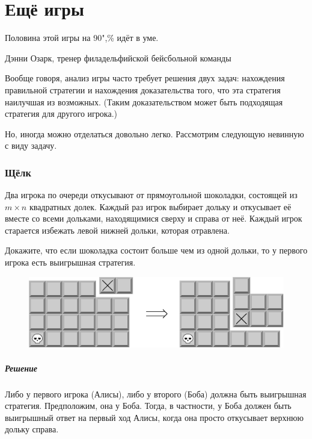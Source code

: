 \documentclass[twoside]{book}
\makeatletter
\newcommand{\rindex}[2][\imki@jobname]{%
  \index[#1]{\detokenize{#2}}%
}
\makeatother
\begin{document}
\chapter{Ещё игры}


\setlength{\epigraphwidth}{.5\textwidth}
\epigraph{Половина этой игры на 90",\% идёт в уме.\vspace{1ex}}{Дэнни Озарк, тренер филадельфийской бейсбольной команды}

Вообще говоря, анализ игры часто требует решения двух задач: нахождения правильной стратегии и нахождения доказательства того, что эта стратегия наилучшая из возможных.
(Таким доказательством может быть подходящая стратегия для другого игрока.)

Но, иногда можно отделаться довольно легко.
Рассмотрим следующую невинную с виду задачу.

\subsection*{Щёлк}%
\rindex{Щёлк}

Два игрока по очереди откусывают от прямоугольной шоколадки, состоящей из $m \times n$ квадратных долек.
Каждый раз игрок выбирает дольку и откусывает её вместе со всеми дольками, находящимися сверху и справа от неё.
Каждый игрок старается избежать левой нижней дольки, которая отравлена.

Докажите, что если шоколадка состоит больше чем из одной дольки, то у первого игрока есть выигрышная стратегия.

\begin{figure}[h]
\centering
\includegraphics{mp/wink-23}
\end{figure}

\paragraph{Решение} Либо у первого игрока (Алисы), либо у второго (Боба) должна быть выигрышная стратегия.
Предположим, она у Боба.
Тогда, в частности, у Боба должен быть выигрышный ответ на первый ход Алисы, когда она просто откусывает верхнюю дольку справа.
\end{document}
